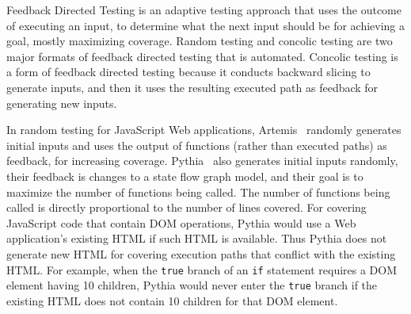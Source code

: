 Feedback Directed Testing is an adaptive testing approach that uses the outcome of executing an input, to determine what the next input should be for achieving a goal, mostly maximizing coverage.  
Random testing and concolic testing are two major formats of feedback directed testing that is automated.  
Concolic testing is a form of feedback directed testing because it conducts backward slicing to generate inputs, and then it uses the resulting executed path as feedback for generating new inputs.  

In random testing for JavaScript Web applications, Artemis~\cite{artemis} randomly generates initial inputs and uses the output of functions (rather than executed paths) as feedback, for increasing coverage.  
Pythia~\cite{pythia} also generates initial inputs randomly, their feedback is changes to a state flow graph model, and their goal is to maximize the number of functions being called.  
The number of functions being called is directly proportional to the number of lines covered.  
For covering JavaScript code that contain DOM operations, Pythia would use a Web application's existing HTML if such HTML is available.  
Thus Pythia does not generate new HTML for covering execution paths that conflict with the existing HTML.  
For example, when the {\tt true} branch of an {\tt if} statement requires a DOM element having 10 children, 
Pythia would never enter the {\tt true} branch if the existing HTML does not contain 10 children for that DOM element.


